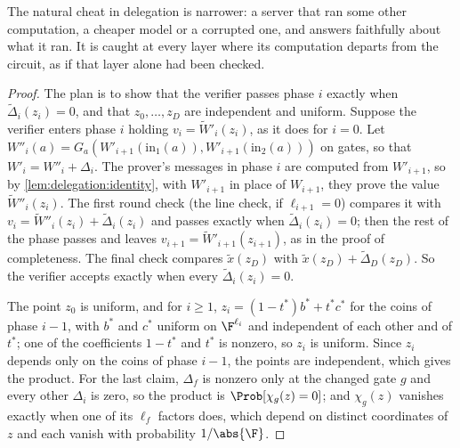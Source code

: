 \begin{refsection}
The natural cheat in delegation is narrower: a server that ran some other computation, a cheaper model or a corrupted one, and answers faithfully about what it ran. It is caught at every layer where its computation departs from the circuit, as if that layer alone had been checked.


\begin{proof}
The plan is to show that the verifier passes phase $i$ exactly when $\tilde\Delta_i(z_i)=0$, and that $z_0,\dots,z_D$ are independent and uniform. Suppose the verifier enters phase $i$ holding $v_i=\tilde W'_i(z_i)$, as it does for $i=0$. Let $W''_i(a)=G_a(W'_{i+1}(\mathrm{in}_1(a)),W'_{i+1}(\mathrm{in}_2(a)))$ on gates, so that $W'_i=W''_i+\Delta_i$. The prover's messages in phase $i$ are computed from $W'_{i+1}$, so by \cref{lem:delegation:identity}, with $W'_{i+1}$ in place of $W_{i+1}$, they prove the value $\tilde W''_i(z_i)$. The first round check (the line check, if $\ell_{i+1}=0$) compares it with $v_i=\tilde W''_i(z_i)+\tilde\Delta_i(z_i)$ and passes exactly when $\tilde\Delta_i(z_i)=0$; then the rest of the phase passes and leaves $v_{i+1}=\tilde W'_{i+1}(z_{i+1})$, as in the proof of completeness. The final check compares $\tilde x(z_D)$ with $\tilde x(z_D)+\tilde\Delta_D(z_D)$. So the verifier accepts exactly when every $\tilde\Delta_i(z_i)=0$.

The point $z_0$ is uniform, and for $i\ge1$, $z_i=(1-t^*)b^*+t^*c^*$ for the coins of phase $i-1$, with $b^*$ and $c^*$ uniform on $\F^{\ell_i}$ and independent of each other and of $t^*$; one of the coefficients $1-t^*$ and $t^*$ is nonzero, so $z_i$ is uniform. Since $z_i$ depends only on the coins of phase $i-1$, the points are independent, which gives the product. For the last claim, $\Delta_f$ is nonzero only at the changed gate $g$ and every other $\Delta_i$ is zero, so the product is $\Prob[\chi_g(z)=0]$; and $\chi_g(z)$ vanishes exactly when one of its $\ell_f$ factors does, which depend on distinct coordinates of $z$ and each vanish with probability $1/\abs{\F}$.
\end{proof}


\end{refsection}
